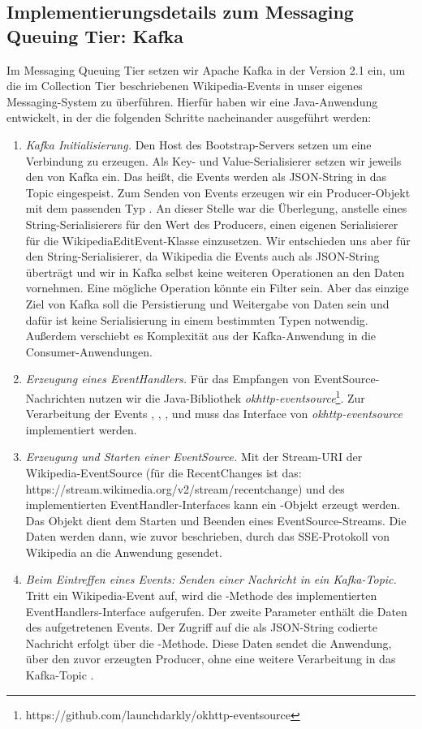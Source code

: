 \subsection{Implementierungsdetails zum Messaging Queuing Tier: Kafka}
Im Messaging Queuing Tier setzen wir Apache Kafka in der Version 2.1 ein, um die im Collection Tier beschriebenen Wikipedia-Events
in unser eigenes Messaging-System zu überführen. Hierfür haben wir eine Java-Anwendung entwickelt, in der die folgenden
Schritte nacheinander ausgeführt werden:
\begin{enumerate}
    \item \textit{Kafka Initialisierung.} Den Host des Bootstrap-Servers setzen um eine Verbindung zu erzeugen.
    Als Key- und Value-Serialisierer setzen wir
    jeweils den  von Kafka ein. Das heißt, die Events werden als JSON-String in das Topic 
    eingespeist. Zum Senden von Events erzeugen wir ein Producer-Objekt mit dem passenden Typ .
    An dieser Stelle war die Überlegung, anstelle eines String-Serialisierers für den Wert des Producers,
    einen eigenen Serialisierer für die WikipediaEditEvent-Klasse einzusetzen. Wir entschieden uns aber für den
    String-Serialisierer, da Wikipedia die Events auch als JSON-String überträgt und wir in Kafka selbst
    keine weiteren Operationen an den Daten vornehmen. Eine mögliche Operation könnte ein Filter sein.
    Aber das einzige Ziel von Kafka soll die Persistierung und Weitergabe von Daten sein und dafür ist keine Serialisierung in
    einem bestimmten Typen notwendig. Außerdem verschiebt es Komplexität aus der Kafka-Anwendung
    in die Consumer-Anwendungen.
    \item \textit{Erzeugung eines EventHandlers.} Für das Empfangen von EventSource-Nachrichten nutzen wir die Java-Bibliothek
    \textit{okhttp-eventsource}\footnote{https://github.com/launchdarkly/okhttp-eventsource}. Zur Verarbeitung der Events
    , , ,  und  muss das Interface  von
    \textit{okhttp-eventsource} implementiert werden.
    \item \textit{Erzeugung und Starten einer EventSource.} Mit der Stream-URI der Wikipedia-EventSource (für die RecentChanges ist das: https://stream.wikimedia.org/v2/stream/recentchange)
    und des implementierten EventHandler-Interfaces
    kann ein -Objekt erzeugt werden. Das Objekt dient dem Starten und Beenden eines EventSource-Streams.
    Die Daten werden dann, wie zuvor beschrieben, durch das SSE-Protokoll von Wikipedia an die Anwendung gesendet.
    \item \textit{Beim Eintreffen eines Events: Senden einer Nachricht in ein Kafka-Topic.} Tritt ein Wikipedia-Event auf,
    wird die -Methode des implementierten EventHandlers-Interface aufgerufen. Der zweite Parameter enthält die Daten
    des aufgetretenen Events. Der Zugriff auf die als JSON-String codierte Nachricht erfolgt über die -Methode.
    Diese Daten sendet die Anwendung, über den zuvor erzeugten Producer, ohne eine weitere
    Verarbeitung in das Kafka-Topic .
\end{enumerate}

